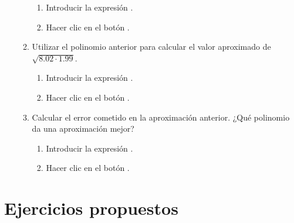 \begin{enumerate}[leftmargin=*]
\begin{enumerate}
\begin{indicacion}
{\begin{enumerate}
\item Introducir la expresión .
\item Hacer clic en el botón .
\end{enumerate}
}
\end{indicacion}
\item Utilizar el polinomio anterior para calcular el valor aproximado de $\sqrt{8.02\cdot 1.99}$.
\begin{indicacion}
{\begin{enumerate}
\item Introducir la expresión .
\item Hacer clic en el botón .
\end{enumerate}
}
\end{indicacion}
\item Calcular el error cometido en la aproximación anterior. ¿Qué polinomio da una aproximación mejor?
\begin{indicacion}
{\begin{enumerate}
\item Introducir la expresión .
\item Hacer clic en el botón .
\end{enumerate}
}
\end{indicacion}
\end{enumerate}
\end{enumerate}


\section{Ejercicios propuestos}

